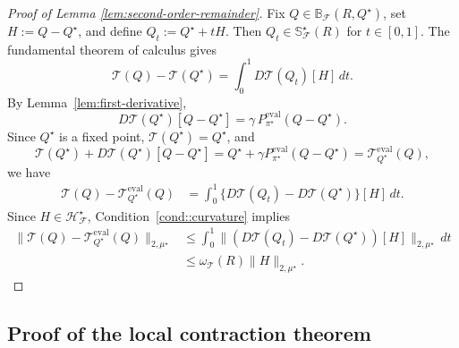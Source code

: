 \documentclass{article}
\theoremstyle{plain}
\theoremstyle{definition}
\theoremstyle{remark}
\begin{document}
\begin{proof}[Proof of Lemma \ref{lem:second-order-remainder}]
Fix \(Q\in\mathbb B_{\mathcal F}(R,Q^\star)\), set
\(H:=Q-Q^\star\), and define \(Q_t:=Q^\star+tH\). Then
\(Q_t\in\mathbb S_{\mathcal F}^\star(R)\) for \(t\in[0,1]\). The
fundamental theorem of calculus gives
\[
\mathcal T(Q)-\mathcal T(Q^\star)
=
\int_0^1D\mathcal T(Q_t)[H]\,dt .
\]
By Lemma~\ref{lem:first-derivative},
\[
D\mathcal{T}(Q^\star)[Q - Q^\star]
=
\gamma\,P^{\mathrm{eval}}_{\pi^\star}(Q - Q^\star).
\]
Since \(Q^\star\) is a fixed point, \(\mathcal{T}(Q^\star)=Q^\star\), and
\[
\mathcal{T}(Q^\star)+D\mathcal{T}(Q^\star)[Q-Q^\star]
=
Q^\star+\gamma P^{\mathrm{eval}}_{\pi^\star}(Q-Q^\star)
=
\mathcal{T}^{\mathrm{eval}}_{Q^\star}(Q),
\]
we have
\begin{align*}
\mathcal T(Q)-\mathcal T^{\mathrm{eval}}_{Q^\star}(Q)
&=
\int_0^1
\{D\mathcal T(Q_t)-D\mathcal T(Q^\star)\}[H]\,dt .
\end{align*}
Since \(H\in\mathcal H_{\mathcal F}^\star\), Condition~\ref{cond::curvature}
implies
\begin{align*}
\bigl\|\mathcal T(Q)-\mathcal T^{\mathrm{eval}}_{Q^\star}(Q)\bigr\|_{2,\mu^\star}
&\le
\int_0^1
\|(D\mathcal T(Q_t)-D\mathcal T(Q^\star))[H]\|_{2,\mu^\star}\,dt
\\
&\le
\omega_{\mathcal T}(R)\|H\|_{2,\mu^\star}.
\end{align*}
\end{proof}

\subsection{Proof of the local contraction theorem}
\end{document}
